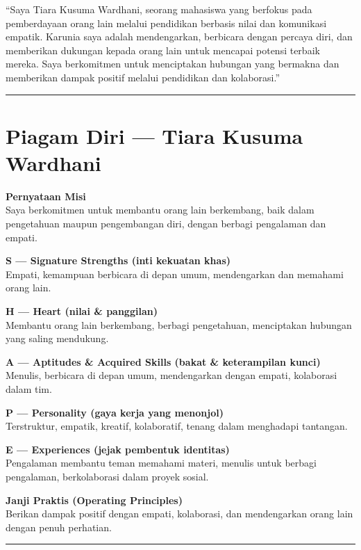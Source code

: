 \documentclass[
  letterpaper,
  DIV=11,
  numbers=noendperiod]{scrreprt}
\begin{document}
``Saya Tiara Kusuma Wardhani, seorang mahasiswa yang berfokus pada
pemberdayaan orang lain melalui pendidikan berbasis nilai dan komunikasi
empatik. Karunia saya adalah mendengarkan, berbicara dengan percaya
diri, dan memberikan dukungan kepada orang lain untuk mencapai potensi
terbaik mereka. Saya berkomitmen untuk menciptakan hubungan yang
bermakna dan memberikan dampak positif melalui pendidikan dan
kolaborasi.''

\begin{center}\rule{0.5\linewidth}{0.5pt}\end{center}

\section{Piagam Diri --- Tiara Kusuma
Wardhani}\label{piagam-diri-tiara-kusuma-wardhani}

\textbf{Pernyataan Misi}\\
Saya berkomitmen untuk membantu orang lain berkembang, baik dalam
pengetahuan maupun pengembangan diri, dengan berbagi pengalaman dan
empati.

\textbf{S --- Signature Strengths (inti kekuatan khas)}\\
Empati, kemampuan berbicara di depan umum, mendengarkan dan memahami
orang lain.

\textbf{H --- Heart (nilai \& panggilan)}\\
Membantu orang lain berkembang, berbagi pengetahuan, menciptakan
hubungan yang saling mendukung.

\textbf{A --- Aptitudes \& Acquired Skills (bakat \& keterampilan
kunci)}\\
Menulis, berbicara di depan umum, mendengarkan dengan empati, kolaborasi
dalam tim.

\textbf{P --- Personality (gaya kerja yang menonjol)}\\
Terstruktur, empatik, kreatif, kolaboratif, tenang dalam menghadapi
tantangan.

\textbf{E --- Experiences (jejak pembentuk identitas)}\\
Pengalaman membantu teman memahami materi, menulis untuk berbagi
pengalaman, berkolaborasi dalam proyek sosial.

\textbf{Janji Praktis (Operating Principles)}\\
Berikan dampak positif dengan empati, kolaborasi, dan mendengarkan orang
lain dengan penuh perhatian.

\begin{center}\rule{0.5\linewidth}{0.5pt}\end{center}
\end{document}

